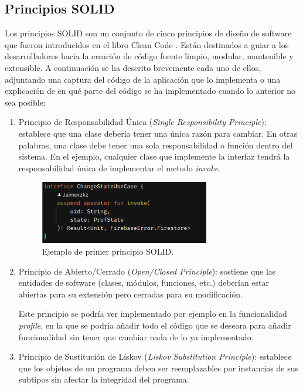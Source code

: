 \subsection{Principios SOLID}
Los principios SOLID son un conjunto de cinco principios de diseño de software que fueron introducidos en el libro Clean Code \citep{CleanCode}. Están destinados a guiar a los desarrolladores hacia la creación de código fuente limpio, modular, mantenible y extensible. A continuación se ha descrito brevemente cada uno de ellos, adjuntando una captura del código de la aplicación que lo implementa o una explicación de en qué parte del código se ha implementado cuando lo anterior no sea posible:
\begin{enumerate}
    \item Principio de Responsabilidad Única (\textit{Single Responsibility Principle}): establece que una clase debería tener una única razón para cambiar. En otras palabras, una clase debe tener una sola responsabilidad o función dentro del sistema. En el ejemplo, cualquier clase que implemente la interfaz tendrá la responsabilidad única de implementar el metodo \textit{invoke}.
    \begin{figure}[h]
        \centering
        \includegraphics[width = 0.7\textwidth]{Imagenes/Fuentes/change_state.png}
        \caption{Ejemplo de primer principio SOLID.}
        \label{fig:change_state}
    \end{figure}
    \item Principio de Abierto/Cerrado (\textit{Open/Closed Principle}): sostiene que las entidades de software (clases, módulos, funciones, etc.) deberían estar abiertas para su extensión pero cerradas para su modificación.
    
    Este principio se podría ver implementado por ejemplo en la funcionalidad \textit{profile}, en la que se podría añadir todo el código que se deseara para añadir funcionalidad sin tener que cambiar nada de lo ya implementado.
    \item Principio de Sustitución de Liskov (\textit{Liskov Substitution Principle}): establece que los objetos de un programa deben ser reemplazables por instancias de sus subtipos sin afectar la integridad del programa.
    

\end{enumerate}
